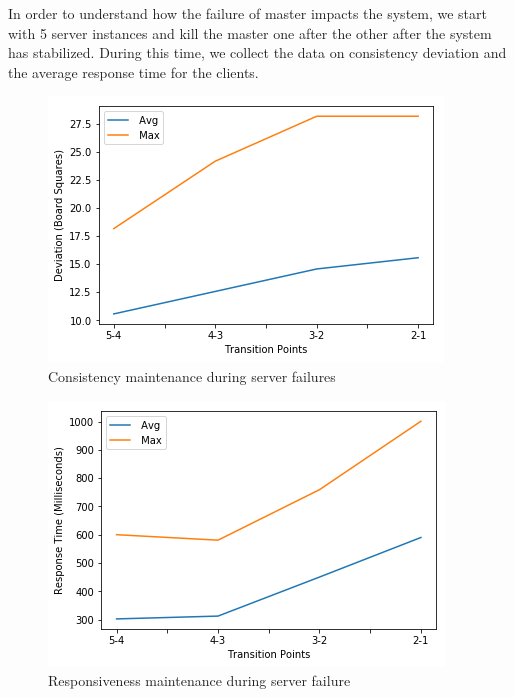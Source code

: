 \documentclass[a4paper]{IEEEtran}
\begin{document}
  In order to understand how the failure of master impacts the system, we start with 5 server instances and kill the master one after the other after the system has stabilized. During this time, we collect the data on consistency deviation and the average response time for the clients.

  \begin{figure}[tbp]
    \centering
      \includegraphics[width=\columnwidth]{fault-tolerance-consistency}
    \caption{Consistency maintenance during server failures}
    \label{fig:fault_tolerance_consistency}
  \end{figure}

  \begin{figure}[tbp]
    \centering
      \includegraphics[width=\columnwidth]{fault-tolerance-responsiveness}
    \caption{Responsiveness maintenance during server failure}
    \label{fig:fault_tolerance_responsiveness}
  \end{figure} 
\end{document}
